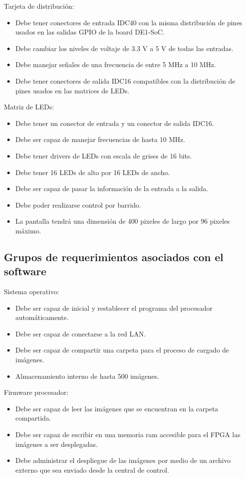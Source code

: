 Tarjeta de distribución:
\begin{itemize}
\item Debe tener conectores de entrada IDC40 con la misma distribución de pines usados en las salidas GPIO de la board DE1-SoC.
\item Debe cambiar los niveles de voltaje de 3.3 V a 5 V de todas las entradas. 
\item Debe manejar señales de una frecuencia de entre 5 MHz a 10 MHz.
\item Debe tener conectores de salida IDC16 compatibles con la distribución de pines usados en las matrices de LEDs.
\end{itemize}
Matriz de LEDs:
\begin{itemize}
\item Debe tener un conector de entrada y un conector de salida IDC16.
\item Debe ser capaz de manejar frecuencias de hasta 10 MHz.
\item Debe tener drivers de LEDs con escala de grises de 16 bits.
\item Debe tener 16 LEDs de alto por 16 LEDs de ancho.
\item Debe ser capaz de pasar la información de la entrada a la salida.
\item Debe poder realizarse control por barrido. 
\item La pantalla tendrá una dimensión de 400 pixeles de largo por 96 pixeles máximo.
\end{itemize}

\subsection{Grupos de requerimientos asociados con el software}

Sistema operativo:
\begin{itemize}
\item Debe ser capaz de inicial y restablecer el programa del procesador automáticamente.
\item Debe ser capaz de conectarse a la red LAN. 
\item Debe ser capaz de compartir una carpeta para el proceso de cargado de imágenes.
\item Almacenamiento interno de hasta 500 imágenes.
\end{itemize}

Firmware procesador:
\begin{itemize}
\item Debe ser capaz de leer las imágenes que se encuentran en la carpeta compartida.
\item Debe ser capaz de escribir en una  memoria ram accesible para el FPGA  las imágenes a ser desplegadas.
\item Debe administrar el despliegue de las imágenes por medio de un archivo externo que sea enviado desde la central de control.
\end{itemize}
